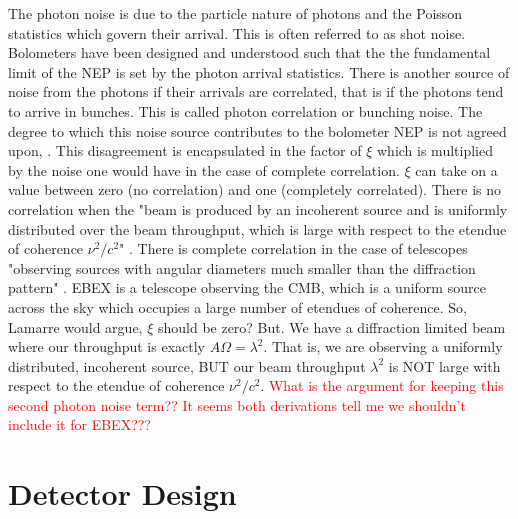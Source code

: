 The photon noise is due to the particle nature of photons and the Poisson statistics which govern their arrival. 
This is often referred to as shot noise.
Bolometers have been designed and understood such that the the fundamental limit of the \ac{NEP} is set by the photon arrival statistics. 
There is another source of noise from the photons if their arrivals are correlated, that is if the photons tend to arrive in bunches. 
This is called photon correlation or bunching noise. 
The degree to which this noise source contributes to the bolometer \ac{NEP} is not agreed upon, \cite{Richards}. 
This disagreement is encapsulated in the factor of $\xi$ which is multiplied by the noise one would have in the case of complete correlation.
$\xi$ can take on a value between zero (no correlation) and one (completely correlated).
There is no correlation when the "beam is produced by an incoherent source and is uniformly distributed over the beam throughput, which is large with respect to the etendue of coherence $\nu^{2}/c^{2}$" \cite{Lamarre}.
There is complete correlation in the case of telescopes "observing sources with angular diameters much smaller than the diffraction pattern" \cite{Lamarre}. 
\ac{EBEX} is a telescope observing the \ac{CMB}, which is a uniform source across the sky which occupies a large number of etendues of coherence. 
So, Lamarre would argue, $\xi$ should be zero?
But. We have a diffraction limited beam where our throughput is exactly $A\Omega = \lambda^{2}$. That is, we are observing a uniformly distributed, incoherent source, BUT our beam throughput $\lambda^{2}$ is NOT large with respect to the etendue of coherence $\nu^{2}/c^{2}$. 
\textcolor{red}{What is the argument for keeping this second photon noise term?? It seems both derivations tell me we shouldn't include it for \ac{EBEX}???}





\section{Detector Design}
\label{sec:detector_design}

